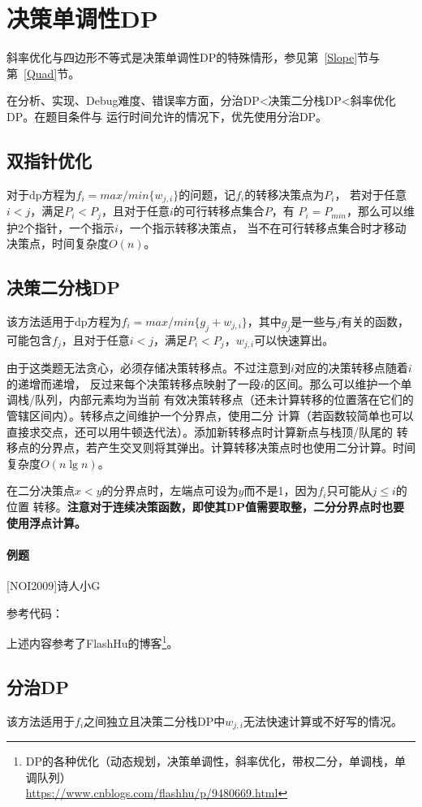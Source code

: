 \section{决策单调性DP}
斜率优化与四边形不等式是决策单调性DP的特殊情形，参见第~\ref{Slope}节与
第~\ref{Quad}节。

在分析、实现、Debug难度、错误率方面，分治DP<决策二分栈DP<斜率优化DP。在题目条件与
运行时间允许的情况下，优先使用分治DP。
\subsection{双指针优化}
对于dp方程为$f_i=max/min\{w_{j,i}\}$的问题，记$f_i$的转移决策点为$P_i$，
若对于任意$i<j$，满足$P_i<P_j$，且对于任意$i$的可行转移点集合$P$，有
$P_i=P_{min}$，那么可以维护2个指针，一个指示$i$，一个指示转移决策点，
当不在可行转移点集合时才移动决策点，时间复杂度$O(n)$。
\subsection{决策二分栈DP}\label{BSDP}
该方法适用于dp方程为$f_i=max/min\{g_j+w_{j,i}\}$，其中$g_j$是一些与$j$有关的函数，
可能包含$f_j$，且对于任意$i<j$，满足$P_i<P_j$，$w_{j,i}$可以快速算出。

由于这类题无法贪心，必须存储决策转移点。不过注意到$i$对应的决策转移点随着$i$的递增而递增，
反过来每个决策转移点映射了一段$i$的区间。那么可以维护一个单调栈/队列，内部元素均为当前
有效决策转移点（还未计算转移的位置落在它们的管辖区间内）。转移点之间维护一个分界点，使用二分
计算（若函数较简单也可以直接求交点，还可以用牛顿迭代法）。添加新转移点时计算新点与栈顶/队尾的
转移点的分界点，若产生交叉则将其弹出。计算转移决策点时也使用二分计算。时间复杂度$O(n\lg n)$。

在二分决策点$x<y$的分界点时，左端点可设为$y$而不是1，因为$f_i$只可能从$j\leq i$的位置
转移。{\bfseries 注意对于连续决策函数，即使其DP值需要取整，二分分界点时也要使用浮点计算。}

\paragraph{例题} [NOI2009]诗人小G

参考代码：


上述内容参考了FlashHu的博客\footnote{
    DP的各种优化（动态规划，决策单调性，斜率优化，带权二分，单调栈，单调队列）\\
    \url{https://www.cnblogs.com/flashhu/p/9480669.html}
}。
\subsection{分治DP}
该方法适用于$f_i$之间独立且决策二分栈DP中$w_{j,i}$无法快速计算或不好写的情况。

